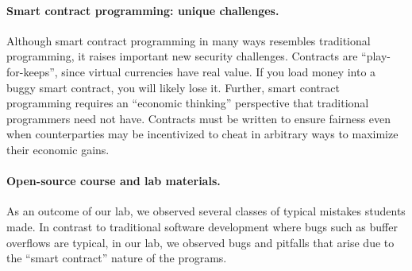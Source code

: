 \documentclass[10pt,twocolumn,letterpaper]{article}
\newcommand{\elaine}[1]{{\color{red}{[elaine: #1]}}}
\newcommand{\ignore}[1]{}
\begin{document}
\ignore{
The first part of this lab consists of step-by-step examples illustrating basic design of functional smart contracts. We highly recommend you take a hands-on approach, and interact with these smart contract examples using the Ethereum simulator! The accompanying materials to everything you need to get started with experimenting, including  a virtual machine image, basic instructions, and a language guide.

The second part of this lab focuses on designing smart contracts that achieve their intended goals, and are robust to attacks. 
Although our lab makes us of a simulator, the smart contracts you write can also be used in the live Ethereum network\footnote{At the time of this writing, the only live Ethereum network is a test network, since the main network has not yet launched.} The basic concepts we discuss apply to other cryptocurrencies as well (including Bitcoin), so most of what you learn will be transferable.
}

\paragraph{Smart contract programming: unique challenges.}
Although smart contract programming in many ways resembles 
traditional programming, 
it raises important new security challenges. 
Contracts are ``play-for-keeps'', since virtual currencies have real value. 
If you load money into a buggy smart contract, you will likely lose it. 
Further, smart contract programming requires
an ``economic thinking'' perspective that traditional
programmers need not have. 
Contracts must be written to ensure fairness even when
counterparties may be incentivized to cheat in arbitrary ways to maximize
their economic gains.

\elaine{say more about all parties being 
selfish, and may do malicious things to maximize its
financial gains.} 

\elaine{stress that even programming a very simple
game like rock paper scissors was difficult
and exposed many problems.}


\paragraph{Open-source course and lab materials.}
As an outcome of our lab, we observed several classes
of typical mistakes students made. 
In contrast to  
traditional software development where 
bugs such as buffer overflows are typical, 
in our lab, we observed 
bugs and pitfalls that arise due to 
the ``smart contract'' nature of the programs. 
\end{document}
